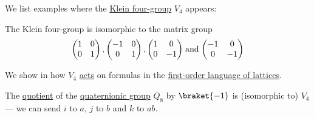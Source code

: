 \begin{example}\label{ex:def:klein_four_group}
  We list examples where the \hyperref[def:klein_four_group]{Klein four-group} \( V_4 \) appears:
  \begin{thmenum}
     The Klein four-group is isomorphic to the matrix group
    \begin{equation}\label{eq:ex:def:klein_four_group/2x2_matrices}
      \begin{pmatrix}
        1 & 0 \\
        0 & 1
      \end{pmatrix}
      ,
      \begin{pmatrix}
        -1 & 0 \\
        0  & 1
      \end{pmatrix}
      ,
      \begin{pmatrix}
        1 & 0 \\
        0 & -1
      \end{pmatrix}
      \T{and}
      \begin{pmatrix}
        -1 & 0 \\
        0  & -1
      \end{pmatrix}
    \end{equation}

     We show in  how \( V_4 \) \hyperref[def:group_action]{acts} on formulas in the \hyperref[def:lattice/theory]{first-order language of lattices}.

     The \hyperref[def:group/quotient]{quotient} of the \hyperref[def:quaternionic_group]{quaternionic group} \( Q_8 \) by \( \braket{ -1 } \) is (isomorphic to) \( V_4 \) --- we can send \( i \) to \( a \), \( j \) to \( b \) and \( k \) to \( ab \).
  \end{thmenum}
\end{example}
